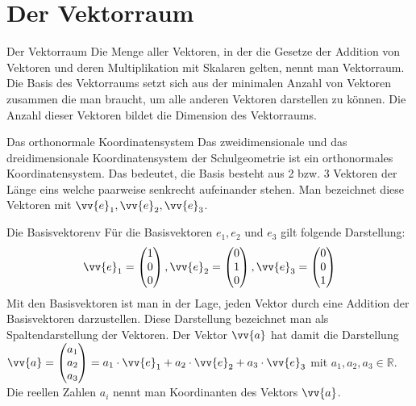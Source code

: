 \section{Der Vektorraum}
\begin{defi}{Der Vektorraum}{}
    Die Menge aller Vektoren, in der die Gesetze der Addition von Vektoren und deren Multiplikation mit Skalaren gelten, nennt man Vektorraum. Die Basis des Vektorraums setzt sich aus der minimalen Anzahl von Vektoren zusammen die man braucht, um alle anderen Vektoren darstellen zu können. Die Anzahl dieser Vektoren bildet die Dimension des Vektorraums.
\end{defi}
\begin{merke}{Das orthonormale Koordinatensystem}{}
    Das zweidimensionale und das dreidimensionale Koordinatensystem der Schulgeometrie ist ein orthonormales Koordinatensystem. Das bedeutet, die Basis besteht aus 2 bzw. 3 Vektoren der Länge eins welche paarweise senkrecht aufeinander stehen. Man bezeichnet diese Vektoren mit $\vv{e}_1, \vv{e}_2, \vv{e}_3$. 
\end{merke}
\begin{b8d}{Die Basisvektoren}{}v
Für die Basisvektoren $e_1, e_2$ und $e_3$ gilt folgende Darstellung:\\
$$\vv{e}_1 =\begin{pmatrix} 1 \\ 0 \\0 \end{pmatrix}, 
\vv{e}_2 =\begin{pmatrix} 0 \\ 1 \\0 \end{pmatrix}, 
\vv{e}_3 =\begin{pmatrix} 0 \\ 0 \\1 \end{pmatrix}$$
Mit den Basisvektoren ist man in der Lage, jeden Vektor durch eine Addition der Basisvektoren darzustellen. Diese Darstellung bezeichnet man als Spaltendarstellung der Vektoren. Der Vektor $\vv{a}$ hat damit die Darstellung $\vv{a} = \begin{pmatrix} a_1 \\ a_2 \\a_3 \end{pmatrix} = a_1\cdot \vv{e}_1 + a_2 \cdot \vv{e}_2 + a_3\cdot \vv{e}_3$ mit $a_1, a_2, a_3 \in \mathds{R}$. Die reellen Zahlen $a_i$ nennt man Koordinanten des Vektors $\vv{a}$.  
\end{b8d}
